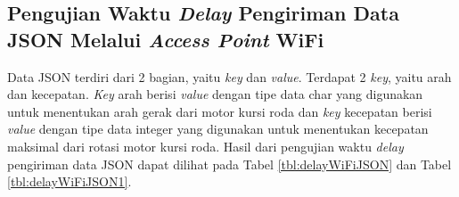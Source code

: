\subsection{Pengujian Waktu \emph{Delay} Pengiriman Data JSON Melalui \emph{Access Point} WiFi}

Data JSON terdiri dari 2 bagian, yaitu \emph{key} dan \emph{value}. Terdapat 2 \emph{key}, yaitu arah dan kecepatan. \emph{Key} arah berisi \emph{value} dengan tipe data char yang digunakan untuk menentukan arah gerak dari motor kursi roda dan \emph{key} kecepatan berisi \emph{value} dengan tipe data integer yang digunakan untuk menentukan kecepatan maksimal dari rotasi motor kursi roda. Hasil dari pengujian waktu \emph{delay} pengiriman data JSON dapat dilihat pada Tabel \ref{tbl:delayWiFiJSON} dan Tabel \ref{tbl:delayWiFiJSON1}.

